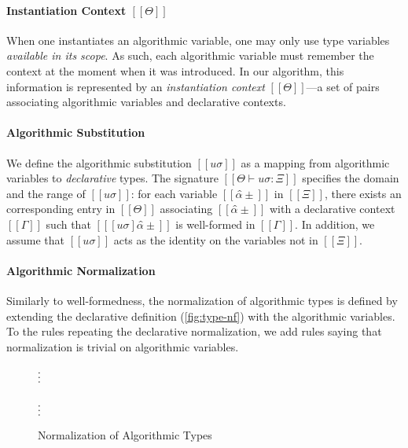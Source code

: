 \paragraph{Instantiation Context $[[Θ]]$}
When one instantiates an algorithmic variable, one may only use type variables
\emph{available in its scope}. As such, each algorithmic variable must remember
the context at the moment when it was introduced. In our algorithm, this
information is represented by an \emph{instantiation context} $[[Θ]]$---a set of
pairs associating algorithmic variables and declarative contexts.

\paragraph{Algorithmic Substitution}
We define the algorithmic substitution $[[uσ]]$ as a mapping from algorithmic
variables to \emph{declarative} types. The signature $[[Θ ⊢ uσ : Ξ]]$
specifies the domain and the range of $[[uσ]]$: for each variable $[[α̂±]]$
in $[[Ξ]]$, there exists an corresponding entry in $[[Θ]]$ associating 
$[[α̂±]]$ with a declarative context $[[Γ]]$ such that $[[ [uσ]α̂± ]]$
is well-formed in $[[Γ]]$. In addition, we assume that $[[uσ]]$
acts as the identity on the variables not in $[[Ξ]]$.


\paragraph{Algorithmic Normalization}
Similarly to well-formedness, the normalization of algorithmic types is defined
by extending the declarative definition (\cref{fig:type-nf}) with the
algorithmic variables. To the rules repeating the declarative normalization, we
add rules saying that normalization is trivial on algorithmic variables.

\begin{figure}
\begin{multicols}{2}
  $\vcenter{\hbox{\vdots}}$\\
  \ottusedrule{\ottdruleNrmPUVar{}}
  \columnbreak\\
  $\vcenter{\hbox{\vdots}}$\\
  \ottusedrule{\ottdruleNrmNUVar{}}
\end{multicols}
\caption{Normalization of Algorithmic Types}
\label{fig:algo-nf}
\end{figure}

